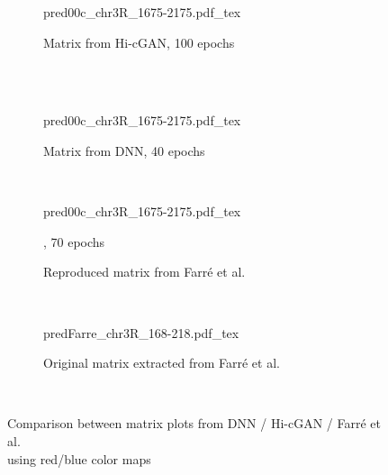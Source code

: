 \begin{figure}[htbp]
\begin{subfigure}{\textwidth}
 \centering
 \scriptsize
 {pred00c_chr3R_1675-2175.pdf_tex}
 \caption{Matrix from Hi-cGAN, 100 epochs} \label{fig:appendix:farre-vs-ours_cgan-matrix}
\end{subfigure}\\[5mm]
\\[2mm]
\begin{subfigure}{\textwidth}
 \centering
 \scriptsize
 {pred00c_chr3R_1675-2175.pdf_tex}
 \caption{Matrix from DNN, 40 epochs} \label{fig:appendix:farre-vs-ours_dnn-matrix}
\end{subfigure}\\[3mm]
\begin{subfigure}{\textwidth}
 \centering
 \scriptsize
 {pred00c_chr3R_1675-2175.pdf_tex}
 \caption{Reproduced matrix from Farr\'e et al. \cite{Farre2018a}}, 70 epochs \label{fig:appendix:farre-vs-ours_farre-matrix_recreated}
\end{subfigure}\\[5mm]
\begin{subfigure}{\textwidth}
 \centering
 \scriptsize
 {predFarre_chr3R_168-218.pdf_tex}
 \caption{Original matrix extracted from Farr\'e et al. \cite{Farre2018a}} \label{fig:appendix:farre-vs-ours_farre-matrix_original}
\end{subfigure}\\[5mm]
\caption{Comparison between matrix plots from DNN / Hi-cGAN / Farr\'e et al. \cite{Farre2018a}\\using red/blue color maps} \label{fig:appendix:farre-vs-ours_matrices}
\end{figure}



\clearpage

